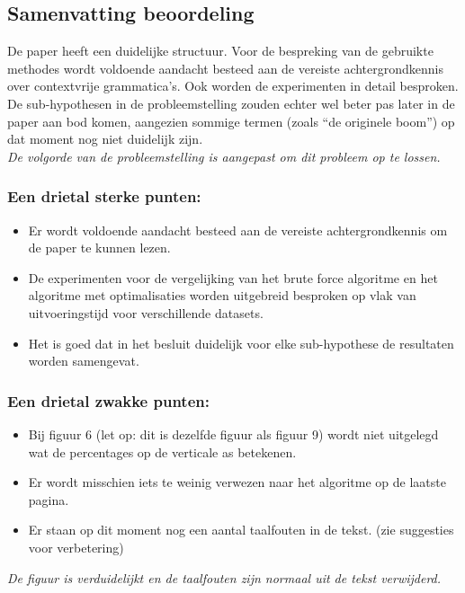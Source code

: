 \documentclass{article}
\begin{document}
\subsection*{Samenvatting beoordeling}

De paper heeft een duidelijke structuur. Voor de bespreking van de gebruikte methodes wordt voldoende aandacht besteed aan de vereiste achtergrondkennis over contextvrije grammatica’s. Ook worden de experimenten in detail besproken. De sub-hypothesen in de probleemstelling zouden echter wel beter pas later in de paper aan bod komen, aangezien sommige termen (zoals “de originele boom”) op dat moment nog niet duidelijk zijn. \\
\textit{De volgorde van de probleemstelling is aangepast om dit probleem op te lossen.}

\subsubsection*{Een drietal sterke punten:}
\begin{itemize}
\item Er wordt voldoende aandacht besteed aan de vereiste achtergrondkennis om de paper te kunnen lezen.
\item De experimenten voor de vergelijking van het brute force algoritme en het algoritme met optimalisaties worden uitgebreid besproken op vlak van uitvoeringstijd voor verschillende datasets.
\item Het is goed dat in het besluit duidelijk voor elke sub-hypothese de resultaten worden samengevat.
\end{itemize}

\subsubsection*{Een drietal zwakke punten:}
\begin{itemize}
\item Bij figuur 6 (let op: dit is dezelfde figuur als figuur 9) wordt niet uitgelegd wat de percentages op de verticale as betekenen.
\item Er wordt misschien iets te weinig verwezen naar het algoritme op de laatste pagina.
\item Er staan op dit moment nog een aantal taalfouten in de tekst. (zie suggesties voor verbetering)
\end{itemize}
\textit{De figuur is verduidelijkt en de taalfouten zijn normaal uit de tekst verwijderd.}
\end{document}
